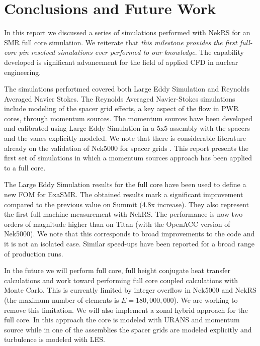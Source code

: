 \section{Conclusions and Future Work}
\label{sec:conc}

In this report we discussed a series of simulations performed with NekRS for an SMR full core simulation. We reiterate that \textit{this milestone provides the first full-core pin resolved simulations ever performed to our knowledge}. The capability developed is significant advancement for the field of applied CFD in nuclear engineering.

The simulations perfortmed covered both Large Eddy Simulation and Reynolds Averaged Navier Stokes. The Reynolds Averaged Navier-Stokes simulations include modeling of the spacer grid effects, a key aspect of the flow in PWR cores, through momentum sources. The momentum sources have been developed and calibrated using Large Eddy Simulation in a 5x5 assembly with the spacers and the vanes explicitly modeled. We note that there is considerable literature already on the validation of Nek5000 for spacer grids \cite{BUSCO2019144} \cite{yuan2020spectral}. This report presents the first set of simulations in which a momentum sources approach has been applied to a full core.

The Large Eddy Simulation results for the full core have been used to define a new FOM for ExaSMR. The obtained results mark a significant improvement compared to the previous value on Summit (4.8x increase). They also represent the first full machine measurement with NekRS.  The performance is now two orders of magnitude higher than on Titan (with the OpenACC version of Nek5000). We note that this corresponds to broad improvements to the code and it is not an isolated case. Similar speed-ups have been reported for a broad range of production runs.

In the future we will perform full core, full height conjugate heat transfer calculations and work toward performing full core coupled calculations with Monte Carlo. This is currently limited by integer overflow in Nek5000 and NekRS (the maximum number of elements is $E=180,000,000$). We are working to remove this limitation. We will also implement a zonal hybrid approach  for the full core. In this approach the core is modeled with URANS and momentum source while in one of the assemblies the spacer grids are modeled explicitly and turbulence is modeled with LES.
